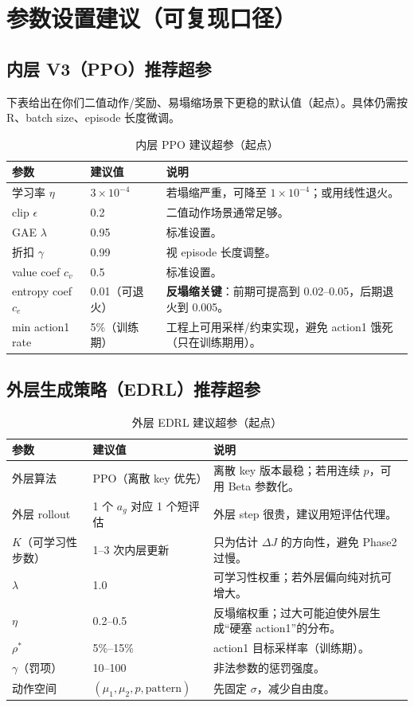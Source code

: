 \documentclass[UTF8,11pt,a4paper]{ctexart}
\begin{document}
\section{参数设置建议（可复现口径）}

\subsection{内层 V3（PPO）推荐超参}
下表给出在你们二值动作/奖励、易塌缩场景下更稳的默认值（起点）。具体仍需按 R、batch size、episode 长度微调。

\begin{table}[H]
\centering
\caption{内层 PPO 建议超参（起点）}
\begin{tabular}{llp{7.5cm}}
\toprule
参数 & 建议值 & 说明\\
\midrule
学习率 $\eta$ & $3\times 10^{-4}$ & 若塌缩严重，可降至 $1\times 10^{-4}$；或用线性退火。\\
clip $\epsilon$ & 0.2 & 二值动作场景通常足够。\\
GAE $\lambda$ & 0.95 & 标准设置。\\
折扣 $\gamma$ & 0.99 & 视 episode 长度调整。\\
value coef $c_v$ & 0.5 & 标准设置。\\
entropy coef $c_e$ & 0.01（可退火） & \textbf{反塌缩关键}：前期可提高到 0.02--0.05，后期退火到 0.005。\\
min action1 rate & 5\%（训练期） & 工程上可用采样/约束实现，避免 action1 饿死（只在训练期用）。\\
\bottomrule
\end{tabular}
\end{table}

\subsection{外层生成策略（EDRL）推荐超参}
\begin{table}[H]
\centering
\caption{外层 EDRL 建议超参（起点）}
\begin{tabular}{llp{7.5cm}}
\toprule
参数 & 建议值 & 说明\\
\midrule
外层算法 & PPO（离散 key 优先） & 离散 key 版本最稳；若用连续 $p$，可用 Beta 参数化。\\
外层 rollout & 1 个 $a_g$ 对应 1 个短评估 & 外层 step 很贵，建议用短评估代理。\\
$K$（可学习性步数） & 1--3 次内层更新 & 只为估计 $\Delta J$ 的方向性，避免 Phase2 过慢。\\
$\lambda$ & 1.0 & 可学习性权重；若外层偏向纯对抗可增大。\\
$\eta$ & 0.2--0.5 & 反塌缩权重；过大可能迫使外层生成``硬塞 action1''的分布。\\
$\rho^*$ & 5\%--15\% & action1 目标采样率（训练期）。\\
$\gamma$（罚项） & 10--100 & 非法参数的惩罚强度。\\
动作空间 & $(\mu_1,\mu_2,p,\text{pattern})$ & 先固定 $\sigma$，减少自由度。\\
\bottomrule
\end{tabular}
\end{table}
\end{document}
